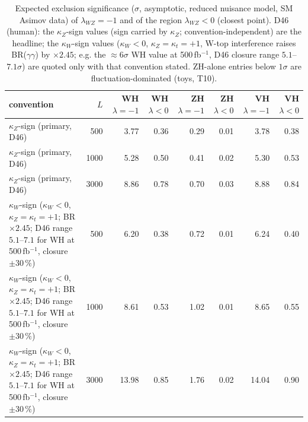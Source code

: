 \begin{table}[ht]\centering\small
\begin{tabular}{lrrrrrrr}\hline
convention & $L$ & WH $\lambda{=}{-}1$ & WH $\lambda{<}0$ & ZH $\lambda{=}{-}1$ & ZH $\lambda{<}0$ & VH $\lambda{=}{-}1$ & VH $\lambda{<}0$ \\\hline
$\kappa_Z$-sign (primary, D46) & 500 & 3.77 & 0.36 & 0.29 & 0.01 & 3.78 & 0.38 \\
$\kappa_Z$-sign (primary, D46) & 1000 & 5.28 & 0.50 & 0.41 & 0.02 & 5.30 & 0.53 \\
$\kappa_Z$-sign (primary, D46) & 3000 & 8.86 & 0.78 & 0.70 & 0.03 & 8.88 & 0.84 \\
$\kappa_W$-sign ($\kappa_W{<}0$, $\kappa_Z{=}\kappa_t{=}{+}1$; BR $\times2.45$; D46 range $5.1$--$7.1$ for WH at 500\,fb$^{-1}$, closure $\pm30\,\%$) & 500 & 6.20 & 0.38 & 0.72 & 0.01 & 6.24 & 0.40 \\
$\kappa_W$-sign ($\kappa_W{<}0$, $\kappa_Z{=}\kappa_t{=}{+}1$; BR $\times2.45$; D46 range $5.1$--$7.1$ for WH at 500\,fb$^{-1}$, closure $\pm30\,\%$) & 1000 & 8.61 & 0.53 & 1.02 & 0.01 & 8.65 & 0.55 \\
$\kappa_W$-sign ($\kappa_W{<}0$, $\kappa_Z{=}\kappa_t{=}{+}1$; BR $\times2.45$; D46 range $5.1$--$7.1$ for WH at 500\,fb$^{-1}$, closure $\pm30\,\%$) & 3000 & 13.98 & 0.85 & 1.76 & 0.02 & 14.04 & 0.90 \\\hline
\end{tabular}
\caption{Expected exclusion significance ($\sigma$, asymptotic, reduced nuisance model, SM Asimov data) of $\lambda_{WZ}{=}{-}1$ and of the region $\lambda_{WZ}<0$ (closest point). D46 (human): the $\kappa_Z$-sign values (sign carried by $\kappa_Z$; convention-independent) are the headline; the $\kappa_W$-sign values ($\kappa_W<0$, $\kappa_Z=\kappa_t=+1$, W-top interference raises BR($\gamma\gamma$) by $\times2.45$; e.g. the $\approx6\sigma$ WH value at 500\,fb$^{-1}$, D46 closure range $5.1$--$7.1\sigma$) are quoted only with that convention stated. ZH-alone entries below $1\sigma$ are fluctuation-dominated (toys, T10).}
\end{table}
